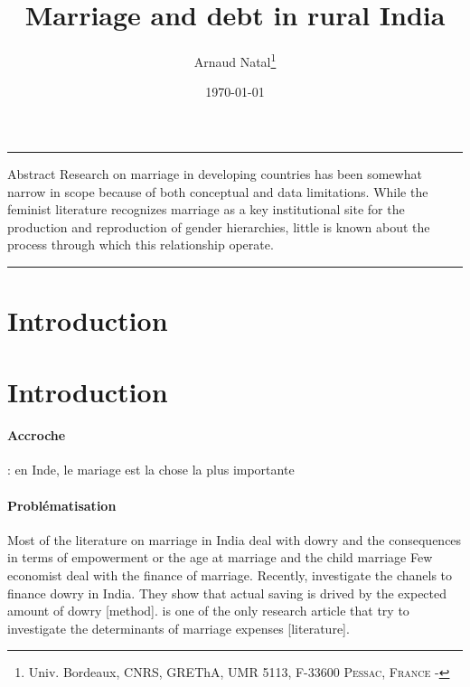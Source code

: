 \documentclass[a4paper, 11pt, onecolumn]{article}
\title{Marriage and debt in rural India}
\author{Arnaud Natal\thanks{Univ. Bordeaux, CNRS, GREThA, UMR 5113, F-33600 \textsc{Pessac, France} - \email{arnaud.natal@u-bordeaux.fr}}}
\date{\today}
\begin{document}
\maketitle

\hrule 
\vspace{0.3cm}

\begin{resab}{Abstract}
Research on marriage in developing countries has been somewhat narrow in scope because of both conceptual and data limitations.
While the feminist literature recognizes marriage as a key institutional site for the production and reproduction of gender hierarchies, little is known about the process through which this relationship operate.

\end{resab}

\begin{keywords}

\end{keywords}

\begin{jelcodes}

\end{jelcodes}

\hrule

\clearpage
\newpage
\section{Introduction}
\label{Introduction}
\section*{Introduction}
\label{section:introduction}
\paragraph{Accroche}
\cite{Dubois1825} : en Inde, le mariage est la chose la plus importante

\citep{Anukriti2018a}


\paragraph{Problématisation}

Most of the literature on marriage in India deal with dowry and the consequences in terms of empowerment \citep{Roy2015, Alfano2017, Srinivasan2007} or the age at marriage and the child marriage \citep{Vogl2013, Sheela2003}
Few economist deal with the finance of marriage.
Recently, \cite{Anukriti2020} investigate the chanels to finance dowry in India.
They show that actual saving is drived by the expected amount of dowry [method].
\cite{Bloch2004} is one of the only research article that try to investigate the determinants of marriage expenses [literature].
\end{document}

